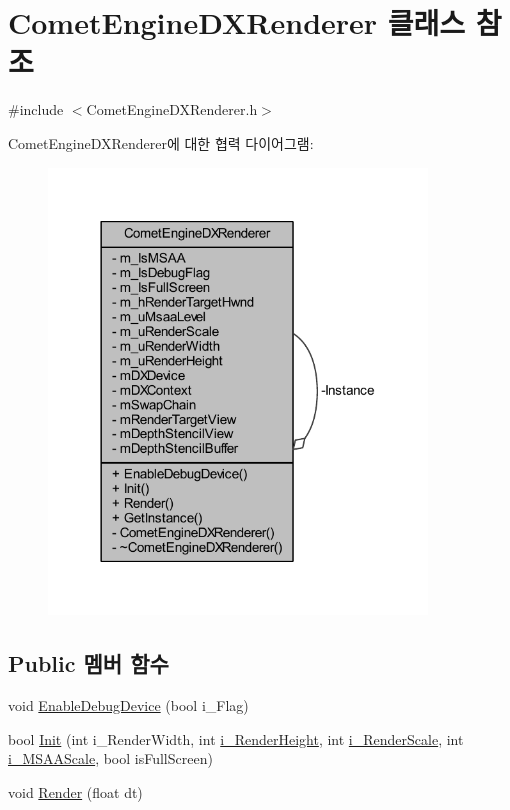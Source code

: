 \hypertarget{class_comet_engine_1_1_renderer_1_1_comet_engine_d_x_renderer}{}\section{Comet\+Engine\+D\+X\+Renderer 클래스 참조}
\label{class_comet_engine_1_1_renderer_1_1_comet_engine_d_x_renderer}


{\ttfamily \#include $<$Comet\+Engine\+D\+X\+Renderer.\+h$>$}



Comet\+Engine\+D\+X\+Renderer에 대한 협력 다이어그램\+:\nopagebreak
\begin{figure}[H]
\begin{center}
\leavevmode
\includegraphics[width=285pt]{class_comet_engine_1_1_renderer_1_1_comet_engine_d_x_renderer__coll__graph}
\end{center}
\end{figure}
\subsection*{Public 멤버 함수}
\begin{DoxyCompactItemize}
\item 
void \hyperlink{class_comet_engine_1_1_renderer_1_1_comet_engine_d_x_renderer_a0cec813dd654a43d162981c37b0cbf6e}{Enable\+Debug\+Device} (bool i\+\_\+\+Flag)
\item 
bool \hyperlink{class_comet_engine_1_1_renderer_1_1_comet_engine_d_x_renderer_a570783c0a51edd5394fdb16137ae37c1}{Init} (int i\+\_\+\+Render\+Width, int \hyperlink{_d_l_l_comet_engine_renderer_8cpp_ab996e2b2e12adfc087c67cebde9194e6}{i\+\_\+\+Render\+Height}, int \hyperlink{_d_l_l_comet_engine_renderer_8cpp_a901222d6138bd4efc54d4eda8460c65b}{i\+\_\+\+Render\+Scale}, int \hyperlink{_d_l_l_comet_engine_renderer_8cpp_a7016fffcce13da83a94427468f9bf950}{i\+\_\+\+M\+S\+A\+A\+Scale}, bool is\+Full\+Screen)
\item 
void \hyperlink{class_comet_engine_1_1_renderer_1_1_comet_engine_d_x_renderer_ac6fa4f62b984d0d34e785bd960255d71}{Render} (float dt)
\end{DoxyCompactItemize}
